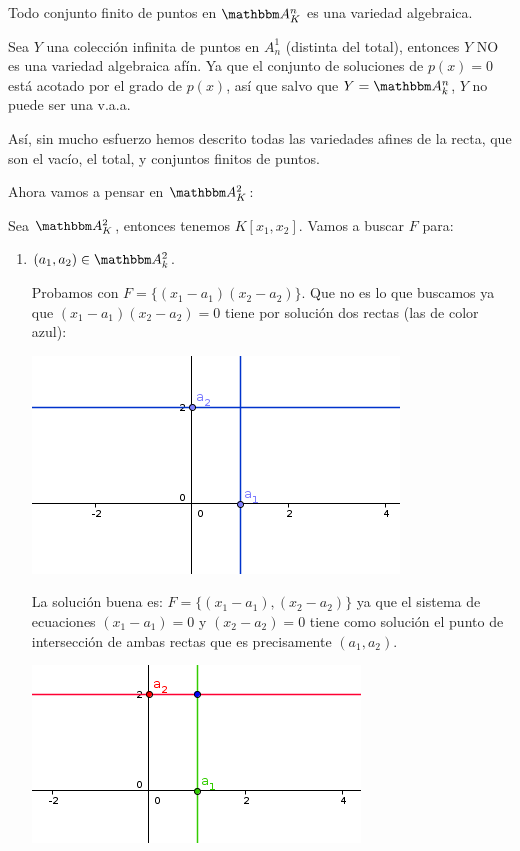\obs Todo conjunto finito de puntos en $\A_K^n$ es una variedad algebraica.

\obs Sea $Y$ una colección infinita de puntos en $A^1_n$ (distinta del total), entonces $Y$ NO es una variedad algebraica afín. Ya que el conjunto de soluciones de $p(x)=0$ está acotado por el grado de $p(x)$, así que salvo que $Y=\A^n_k$, $Y$ no puede ser una v.a.a.

Así, sin mucho esfuerzo hemos descrito todas las variedades afines de la recta, que son el vacío, el total, y conjuntos finitos de puntos.

Ahora vamos a pensar en  $\A_K^2$:
\begin{example}	
	Sea $\A_K^2$, entonces tenemos $K[x_1,x_2]$. Vamos a buscar $F$ para:
	
	\begin{enumerate}
		\item $(a_1,a_2) \in \A^2_k$.
		
		Probamos con $F=\{(x_1-a_1)(x_2-a_2)\}$. Que no es lo que buscamos ya que $(x_1-a_1)(x_2-a_2)=0$ tiene por solución dos rectas (las de color azul):
		
		\begin{center}
			\includegraphics[scale=0.45]{img/ej1.png}
		\end{center}
		
		La solución buena es:  $F=\{(x_1-a_1),(x_2-a_2)\}$ ya que el sistema de ecuaciones $(x_1-a_1)=0$ y $(x_2-a_2)=0$ tiene como solución el punto de intersección de ambas rectas que es precisamente $(a_1,a_2)$.
		
		\begin{center}
			\includegraphics[scale=0.45]{img/ej2.png}
		\end{center}
		

\end{enumerate}
\end{example}
